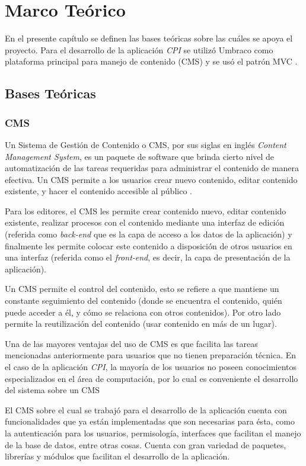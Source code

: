 \chapter{Marco Teórico}
En el presente capítulo se definen las bases teóricas sobre las cuáles se apoya el proyecto. Para el desarrollo de la aplicación \textit{CPI} se utilizó Umbraco \cite{umbraco} como plataforma principal para manejo de contenido (CMS) \cite{cmsBarker} y se usó el patrón MVC \cite{mvcKrasner}.

\section{Bases Teóricas}

\subsection{CMS}
Un Sistema de Gestión de Contenido o CMS, por sus siglas en inglés \textit{Content Management System}, es un paquete de software que brinda cierto nivel de automatización de las tareas requeridas para administrar el contenido de manera efectiva. Un CMS permite a los usuarios crear nuevo contenido, editar contenido existente, y hacer el contenido accesible al público \cite{cmsBarker}.

Para los editores, el CMS les permite crear contenido nuevo, editar contenido existente, realizar procesos con el contenido mediante una interfaz de edición (referida como \textit{back-end} que es la capa de acceso a los datos de la aplicación) y finalmente les permite colocar este contenido a disposición de otros usuarios en una interfaz (referida como el \textit{front-end}, es decir, la capa de presentación de la aplicación).

Un CMS permite el control del contenido, esto se refiere a que mantiene un constante seguimiento del contenido (donde se encuentra el contenido, quién puede acceder a él, y cómo se relaciona con otros contenidos). Por otro lado permite la reutilización del contenido (usar contenido en más de un lugar).

Una de las mayores ventajas del uso de CMS es que facilita las tareas mencionadas anteriormente para usuarios que no tienen preparación técnica. En el caso de la aplicación \textit{CPI}, la mayoría de los usuarios no poseen conocimientos especializados en el área de computación, por lo cual es conveniente el desarrollo del sistema sobre un CMS

El CMS sobre el cual se trabajó para el desarrollo de la aplicación cuenta con funcionalidades que ya están implementadas que son necesarias para ésta, como la autenticación para los usuarios, permisología, interfaces que facilitan el manejo de la base de datos, entre otras cosas. Cuenta con gran variedad de paquetes, librerías y módulos que facilitan el desarrollo de la aplicación.

